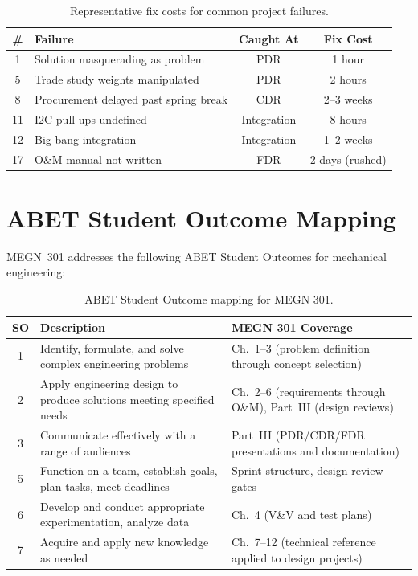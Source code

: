 \documentclass[11pt,letterpaper,twoside,openany]{book}
\begin{document}
\begin{table}[htbp]\centering\small
\begin{tabularx}{\textwidth}{c X c c}
\toprule
\textbf{\#} & \textbf{Failure} & \textbf{Caught At} & \textbf{Fix Cost} \\
\midrule
1 & Solution masquerading as problem & PDR & 1 hour \\
5 & Trade study weights manipulated & PDR & 2 hours \\
8 & Procurement delayed past spring break & CDR & 2--3 weeks \\
11 & I2C pull-ups undefined & Integration & 8 hours \\
12 & Big-bang integration & Integration & 1--2 weeks \\
17 & O\&M manual not written & FDR & 2 days (rushed) \\
\bottomrule
\end{tabularx}
\caption{Representative fix costs for common project failures.}
\end{table}




\chapter*{ABET Student Outcome Mapping}

MEGN~301 addresses the following ABET Student Outcomes for mechanical engineering:

\begin{table}[htbp]\centering\small
\begin{tabularx}{\textwidth}{c X X}
\toprule
\textbf{SO} & \textbf{Description} & \textbf{MEGN 301 Coverage} \\
\midrule
1 & Identify, formulate, and solve complex engineering problems & Ch.~1--3 (problem definition through concept selection) \\
2 & Apply engineering design to produce solutions meeting specified needs & Ch.~2--6 (requirements through O\&M), Part~III (design reviews) \\
3 & Communicate effectively with a range of audiences & Part~III (PDR/CDR/FDR presentations and documentation) \\
5 & Function on a team, establish goals, plan tasks, meet deadlines & Sprint structure, design review gates \\
6 & Develop and conduct appropriate experimentation, analyze data & Ch.~4 (V\&V and test plans) \\
7 & Acquire and apply new knowledge as needed & Ch.~7--12 (technical reference applied to design projects) \\
\bottomrule
\end{tabularx}
\caption{ABET Student Outcome mapping for MEGN 301.}
\end{table}
\end{document}
